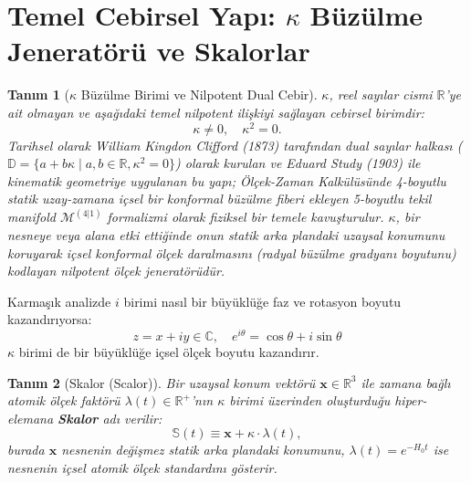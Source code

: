 \documentclass[11pt,a4paper]{article}
\newtheorem{definition}{Tanım}[section]
\begin{document}
\section{Temel Cebirsel Yapı: $\kappa$ Büzülme Jeneratörü ve Skalorlar}
\label{sec:cebir}

\begin{definition}[$\kappa$ Büzülme Birimi ve Nilpotent Dual Cebir]
    \label{def:kappa_nilpotent_sc}
    $\kappa$, reel sayılar cismi $\mathbb{R}$'ye ait olmayan ve aşağıdaki temel nilpotent ilişkiyi sağlayan cebirsel birimdir:
    \begin{equation}
        \kappa \neq 0, \quad \kappa^2 = 0.
        \label{eq:kappa_tanim}
    \end{equation}
    Tarihsel olarak William Kingdon Clifford (1873) tarafından dual sayılar halkası ($\mathbb{D} = \{a + b\kappa \mid a, b \in \mathbb{R}, \kappa^2 = 0\}$) olarak kurulan ve Eduard Study (1903) ile kinematik geometriye uygulanan bu yapı; Ölçek-Zaman Kalkülüsünde 4-boyutlu statik uzay-zamana içsel bir konformal büzülme fiberi ekleyen 5-boyutlu tekil manifold $\mathcal{M}^{(4|1)}$ formalizmi olarak fiziksel bir temele kavuşturulur. $\kappa$, bir nesneye veya alana etki ettiğinde onun statik arka plandaki uzaysal konumunu koruyarak içsel konformal ölçek daralmasını (radyal büzülme gradyanı boyutunu) kodlayan nilpotent ölçek jeneratörüdür.
\end{definition}

Karmaşık analizde $i$ birimi nasıl bir büyüklüğe faz ve rotasyon boyutu kazandırıyorsa:
$$z = x + i y \in \mathbb{C}, \quad e^{i\theta} = \cos\theta + i \sin\theta$$
$\kappa$ birimi de bir büyüklüğe içsel ölçek boyutu kazandırır.

\begin{definition}[Skalor (Scalor)]
    \label{def:skalor_sc}
    Bir uzaysal konum vektörü $\mathbf{x} \in \mathbb{R}^3$ ile zamana bağlı atomik ölçek faktörü $\lambda(t) \in \mathbb{R}^+$'nın $\kappa$ birimi üzerinden oluşturduğu hiper-elemana \textbf{Skalor} adı verilir:
    \begin{equation}
        \mathbb{S}(t) \equiv \mathbf{x} + \kappa \cdot \lambda(t),
        \label{eq:skalor_tanim}
    \end{equation}
    burada $\mathbf{x}$ nesnenin değişmez statik arka plandaki konumunu, $\lambda(t) = e^{-H_0 t}$ ise nesnenin içsel atomik ölçek standardını gösterir.
\end{definition}
\end{document}
